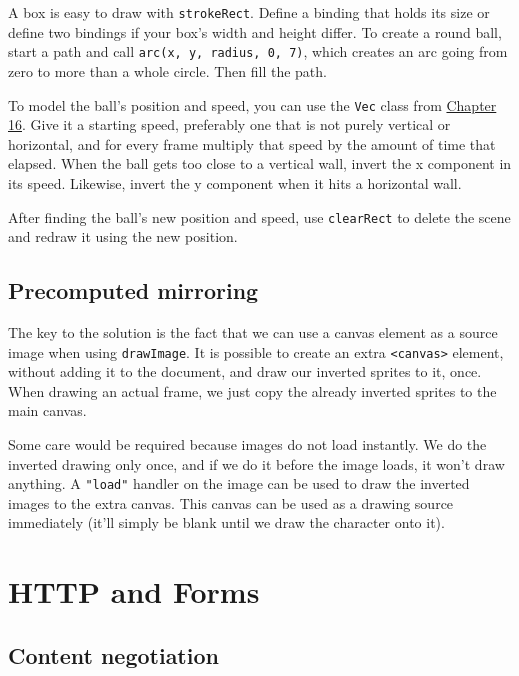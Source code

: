 A box is easy to draw with \lstinline`strokeRect`. Define a binding that holds its size or define two bindings if your box's width and height differ. To create a round ball, start a path and call \lstinline`arc(x, y, radius, 0, 7)`, which creates an arc going from zero to more than a whole circle. Then fill the path.

To model the ball's position and speed, you can use the \lstinline`Vec` class from \hyperref[game.vector]{Chapter 16}. Give it a starting speed, preferably one that is not purely vertical or horizontal, and for every frame multiply that speed by the amount of time that elapsed. When the ball gets too close to a vertical wall, invert the x component in its speed. Likewise, invert the y component when it hits a horizontal wall.

After finding the ball's new position and speed, use \lstinline`clearRect` to delete the scene and redraw it using the new position.

\subsection{Precomputed mirroring}

The key to the solution is the fact that we can use a canvas element as a source image when using \lstinline`drawImage`. It is possible to create an extra \lstinline`<canvas>` element, without adding it to the document, and draw our inverted sprites to it, once. When drawing an actual frame, we just copy the already inverted sprites to the main canvas.

Some care would be required because images do not load instantly. We do the inverted drawing only once, and if we do it before the image loads, it won't draw anything. A \lstinline`"load"` handler on the image can be used to draw the inverted images to the extra canvas. This canvas can be used as a drawing source immediately (it'll simply be blank until we draw the character onto it).

\section{HTTP and Forms}

\subsection{Content negotiation}


